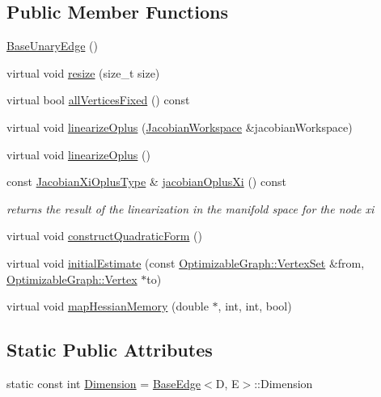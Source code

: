 \subsection*{Public Member Functions}
\begin{DoxyCompactItemize}
\item 
\hyperlink{classg2o_1_1BaseUnaryEdge_a7375d1ebfb57ba0308f863739b817b15}{Base\+Unary\+Edge} ()
\item 
virtual void \hyperlink{classg2o_1_1BaseUnaryEdge_a01fcdfd2d3ed0325655bb99db95c0b10}{resize} (size\+\_\+t size)
\item 
virtual bool \hyperlink{classg2o_1_1BaseUnaryEdge_ae3db6c719eac18fce051b40a8c8b86dd}{all\+Vertices\+Fixed} () const 
\item 
virtual void \hyperlink{classg2o_1_1BaseUnaryEdge_a8b396647b5b438d30a04758023baa595}{linearize\+Oplus} (\hyperlink{classg2o_1_1JacobianWorkspace}{Jacobian\+Workspace} \&jacobian\+Workspace)
\item 
virtual void \hyperlink{classg2o_1_1BaseUnaryEdge_a367f19b903938faf6e89dd1b0e4e722b}{linearize\+Oplus} ()
\item 
const \hyperlink{classg2o_1_1BaseUnaryEdge_a24bcabd661223e15b7337f2835310f5e}{Jacobian\+Xi\+Oplus\+Type} \& \hyperlink{classg2o_1_1BaseUnaryEdge_a39a254035af4f53fc3a6b5a77cd5a0ca}{jacobian\+Oplus\+Xi} () const 
\begin{DoxyCompactList}\small\item\em returns the result of the linearization in the manifold space for the node xi \end{DoxyCompactList}\item 
virtual void \hyperlink{classg2o_1_1BaseUnaryEdge_ad7e6dc44c571be159f066bdb961ade2b}{construct\+Quadratic\+Form} ()
\item 
virtual void \hyperlink{classg2o_1_1BaseUnaryEdge_a3d3311901116092cf817b094f6a0b44b}{initial\+Estimate} (const \hyperlink{classg2o_1_1HyperGraph_a703938cdb4bb636860eed55a2489d70c}{Optimizable\+Graph\+::\+Vertex\+Set} \&from, \hyperlink{classg2o_1_1OptimizableGraph_1_1Vertex}{Optimizable\+Graph\+::\+Vertex} $\ast$to)
\item 
virtual void \hyperlink{classg2o_1_1BaseUnaryEdge_a919dcb89130f6e7082e807530facdd78}{map\+Hessian\+Memory} (double $\ast$, int, int, bool)
\end{DoxyCompactItemize}
\subsection*{Static Public Attributes}
\begin{DoxyCompactItemize}
\item 
static const int \hyperlink{classg2o_1_1BaseUnaryEdge_a4e584cf552998a34948d8d5b484f7fd3}{Dimension} = \hyperlink{classg2o_1_1BaseEdge}{Base\+Edge}$<$D, E$>$\+::Dimension
\end{DoxyCompactItemize}
